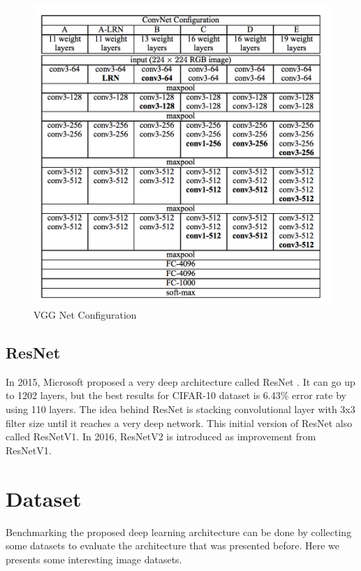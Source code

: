 \begin{figure}[h]
	\includegraphics[scale=0.5]{figures/vggnet}
	\centering
	\caption{VGG Net Configuration \cite{simonyan2014very}}
	\label{fig:vgg}
\end{figure}


\subsection{ResNet}
In 2015, Microsoft proposed a very deep architecture called ResNet \cite{he2016deep}. It can go up to 1202 layers, but the best results for CIFAR-10 dataset is 6.43\% error rate by using 110 layers. The idea behind ResNet is stacking convolutional layer with 3x3 filter size until it reaches a very deep network. This initial version of ResNet also called ResNetV1. In 2016, ResNetV2 is introduced \cite{he2016identity} as improvement from ResNetV1.


\section{Dataset}
Benchmarking the proposed deep learning architecture can be done by collecting some datasets to evaluate the architecture that was presented before. Here we presents some interesting image datasets.
